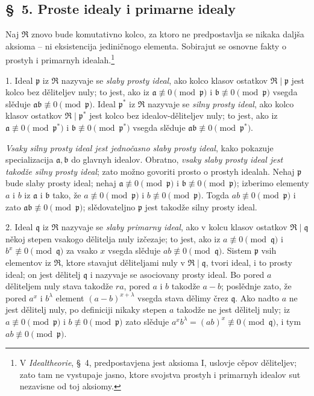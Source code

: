 \documentclass[11pt]{article}
\providecommand{\mR}{\mathfrak{R}}
\providecommand{\ma}{\mathfrak{a}}
\providecommand{\mb}{\mathfrak{b}}
\providecommand{\mq}{\mathfrak{q}}
\providecommand{\mpideal}{\mathfrak{p}}
\begin{document}
\setcounter{footnote}{19}

\subsection*{\S~5. Proste idealy i primarne idealy}

Naj $\mR$ znovo bude komutativno kolco, za ktoro ne predpostavlja se nikaka daljša aksioma -- ni eksistencija jediničnogo elementa. Sobirajut se osnovne fakty o prostyh i primarnyh idealah.\footnote{V \emph{Idealtheorie}, \S~4, predpostavjena jest aksioma I, uslovje cěpov děliteljev; zato tam ne vystupaje jasno, ktore svojstva prostyh i primarnyh idealov sut nezavisne od toj aksiomy.}

1. Ideal $\mpideal$ iz $\mR$ nazyvaje se \emph{slaby prosty ideal}, ako kolco klasov ostatkov $\mR\mid\mpideal$ jest kolco bez děliteljev nuly; to jest, ako iz $\ma\not\equiv0\pmod{\mpideal}$ i $\mb\not\equiv0\pmod{\mpideal}$ vsegda slěduje $\ma\mb\not\equiv0\pmod{\mpideal}$. Ideal $\mpideal^*$ iz $\mR$ nazyvaje se \emph{silny prosty ideal}, ako kolco klasov ostatkov $\mR\mid\mpideal^*$ jest kolco bez idealov-děliteljev nuly; to jest, ako iz $\ma\not\equiv0\pmod{\mpideal^*}$ i $\mb\not\equiv0\pmod{\mpideal^*}$ vsegda slěduje $\ma\mb\not\equiv0\pmod{\mpideal^*}$.

\emph{Vsaky silny prosty ideal jest jednočasno slaby prosty ideal}, kako pokazuje specializacija $\ma,\mb$ do glavnyh idealov. Obratno, \emph{vsaky slaby prosty ideal jest takodže silny prosty ideal}; zato možno govoriti prosto o prostyh idealah. Nehaj $\mpideal$ bude slaby prosty ideal; nehaj $\ma\not\equiv0\pmod{\mpideal}$ i $\mb\not\equiv0\pmod{\mpideal}$; izberimo elementy $a$ i $b$ iz $\ma$ i $\mb$ tako, že $a\not\equiv0\pmod{\mpideal}$ i $b\not\equiv0\pmod{\mpideal}$. Togda $ab\not\equiv0\pmod{\mpideal}$ i zato $\ma\mb\not\equiv0\pmod{\mpideal}$; slědovateljno $\mpideal$ jest takodže silny prosty ideal.

2. Ideal $\mq$ iz $\mR$ nazyvaje se \emph{slaby primarny ideal}, ako v kolcu klasov ostatkov $\mR\mid\mq$ někoj stepen vsakogo dělitelja nuly izčezaje; to jest, ako iz $a\not\equiv0\pmod{\mq}$ i $b^x\not\equiv0\pmod{\mq}$ za vsako $x$ vsegda slěduje $ab\not\equiv0\pmod{\mq}$. Sistem $\mpideal$ vsih elementov iz $\mR$, ktore stavajut děliteljami nuly v $\mR\mid\mq$, tvori ideal, i to prosty ideal; on jest dělitelj $\mq$ i nazyvaje se asociovany prosty ideal. Bo pored $a$ děliteljem nuly stava takodže $ra$, pored $a$ i $b$ takodže $a-b$; poslědnje zato, že pored $a^x$ i $b^\lambda$ element $(a-b)^{x+\lambda}$ vsegda stava dělimy črez $\mq$. Ako nadto $a$ ne jest dělitelj nuly, po definiciji nikaky stepen $a$ takodže ne jest dělitelj nuly; iz $a\not\equiv0\pmod{\mpideal}$ i $b\not\equiv0\pmod{\mpideal}$ zato slěduje $a^x b^\lambda=(ab)^x\not\equiv0\pmod{\mq}$, i tym $ab\not\equiv0\pmod{\mpideal}$.
\end{document}
